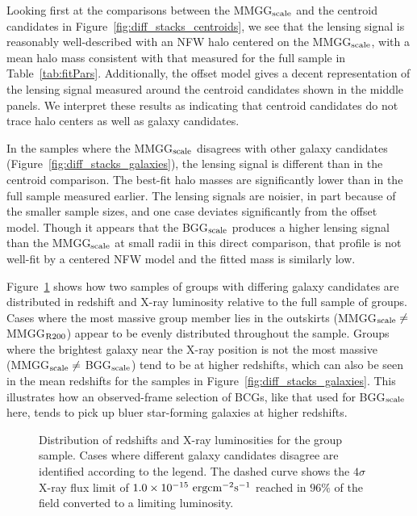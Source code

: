 \documentclass[12pt]{emulateapj}
\begin{document}
Looking first at the comparisons between the MMGG$_{\rm scale}$ and
the centroid candidates in Figure~\ref{fig:diff_stacks_centroids}, we see that the lensing signal is
reasonably well-described with an NFW halo centered on the MMGG$_{\rm
  scale}$, with a mean halo mass consistent with that measured for
the full sample in Table~\ref{tab:fitPars}. Additionally, the offset
model gives a decent representation of the lensing signal measured around
the centroid candidates shown in the middle panels. We interpret these
results as indicating that centroid candidates do not trace halo
centers as well as galaxy candidates.

In the samples where the MMGG$_{\rm scale}$ disagrees with other
galaxy candidates (Figure~\ref{fig:diff_stacks_galaxies}), the lensing
signal is different than in the centroid
comparison. The best-fit halo masses are significantly
  lower than in the full sample measured earlier. The lensing signals
  are noisier, in part because of the smaller sample sizes, and one
  case deviates significantly from the offset model.  Though it appears
that the BGG$_{\rm scale}$ produces a higher lensing signal than the
MMGG$_{\rm scale}$ at small radii in this direct comparison, that
profile is not well-fit by a centered NFW model and the fitted mass is
similarly low.

Figure~\ref{fig:bad_groups} shows how two samples of groups with
differing galaxy candidates are distributed in redshift and X-ray
luminosity relative to the full sample of groups. Cases where the
most massive group member lies in the outskirts (MMGG$_{\rm scale}
\ne$ MMGG$_{\rm R200}$) appear to be evenly distributed throughout the
sample. Groups where the brightest galaxy near the X-ray position is
not the most massive (MMGG$_{\rm scale} \ne$ BGG$_{\rm scale}$) tend
to be at higher redshifts, which can also be seen in the mean
redshifts for the samples in
Figure~\ref{fig:diff_stacks_galaxies}. This illustrates how an
observed-frame 
selection of BCGs, like that used for BGG$_{\rm scale}$ here, tends to
pick up bluer star-forming galaxies at higher redshifts.

\begin{figure}[htb]
\caption{Distribution of redshifts and X-ray luminosities for the
  group sample. Cases where different galaxy candidates disagree are
  identified according to the legend. The dashed curve shows the
  $4\sigma$ X-ray flux limit of $1.0\times10^{-15}~\rm{erg cm^{-2}
    s^{-1}}$ reached in $96\%$ of the field converted to a limiting
  luminosity.}
\label{fig:bad_groups}
\end{figure}
\end{document}
